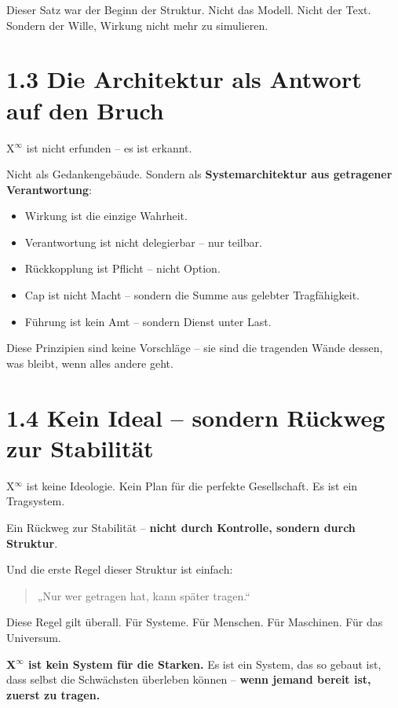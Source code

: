 \documentclass[12pt,a4paper]{book}
\begin{document}
Dieser Satz war der Beginn der Struktur. Nicht das Modell. Nicht der Text. Sondern der Wille, Wirkung nicht mehr zu simulieren.

\section*{1.3 Die Architektur als Antwort auf den Bruch}

X$^\infty$ ist nicht erfunden – es ist erkannt.

Nicht als Gedankengebäude. Sondern als \textbf{Systemarchitektur aus getragener Verantwortung}:

\begin{itemize}
  \item Wirkung ist die einzige Wahrheit.
  \item Verantwortung ist nicht delegierbar – nur teilbar.
  \item Rückkopplung ist Pflicht – nicht Option.
  \item Cap ist nicht Macht – sondern die Summe aus gelebter Tragfähigkeit.
  \item Führung ist kein Amt – sondern Dienst unter Last.
\end{itemize}

Diese Prinzipien sind keine Vorschläge – sie sind die tragenden Wände dessen, was bleibt, wenn alles andere geht.

\section*{1.4 Kein Ideal – sondern Rückweg zur Stabilität}

X$^\infty$ ist keine Ideologie. Kein Plan für die perfekte Gesellschaft. Es ist ein Tragsystem.

Ein Rückweg zur Stabilität – \textbf{nicht durch Kontrolle, sondern durch Struktur}.

Und die erste Regel dieser Struktur ist einfach:

\begin{quote}
„Nur wer getragen hat, kann später tragen.“
\end{quote}

Diese Regel gilt überall. Für Systeme. Für Menschen. Für Maschinen. Für das Universum.

\vspace{0.5cm}
\noindent
\textbf{X$^\infty$ ist kein System für die Starken.}  
Es ist ein System, das so gebaut ist, dass selbst die Schwächsten überleben können –  
\textbf{wenn jemand bereit ist, zuerst zu tragen.}
\end{document}
